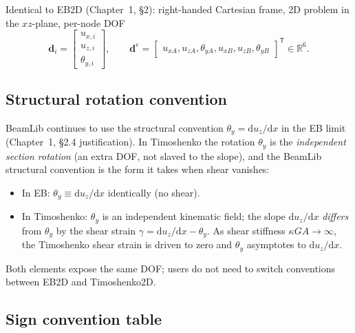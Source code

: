 \documentclass[11pt,a4paper]{article}
\newcommand{\dd}{\mathrm{d}}
\newcommand{\bmath}[1]{\boldsymbol{#1}}
\begin{document}
Identical to EB2D (Chapter~1, \S2): right-handed Cartesian frame, 2D problem in the $xz$-plane, per-node DOF
\[
\bmath{d}_i = \begin{bmatrix} u_{x,i} \\ u_{z,i} \\ \theta_{y,i} \end{bmatrix},
\qquad
\bmath{d}^e = \begin{bmatrix} u_{xA}, u_{zA}, \theta_{yA}, u_{xB}, u_{zB}, \theta_{yB} \end{bmatrix}^\mathsf{T} \in \mathbb{R}^6.
\]

\subsection{Structural rotation convention}\label{sec:thetay}

BeamLib continues to use the structural convention $\theta_y = \dd u_z / \dd x$ in the EB limit (Chapter~1, \S2.4 justification). In Timoshenko the rotation $\theta_y$ is the \emph{independent section rotation} (an extra DOF, not slaved to the slope), and the BeamLib structural convention is the form it takes when shear vanishes:
\begin{itemize}
    \item In EB: $\theta_y \equiv \dd u_z / \dd x$ identically (no shear).
    \item In Timoshenko: $\theta_y$ is an independent kinematic field; the slope $\dd u_z / \dd x$ \emph{differs} from $\theta_y$ by the shear strain $\gamma = \dd u_z / \dd x - \theta_y$. As shear stiffness $\kappa GA \to \infty$, the Timoshenko shear strain is driven to zero and $\theta_y$ asymptotes to $\dd u_z / \dd x$.
\end{itemize}
Both elements expose the same DOF; users do not need to switch conventions between EB2D and Timoshenko2D.

\subsection{Sign convention table}
\end{document}
